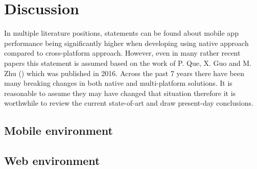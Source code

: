 
\chapter{Discussion}

In multiple literature positions, statements can be found about mobile app performance being significantly higher when developing using native approach compared to cross-platform approach. However, even in many rather recent papers this statement is assumed based on the work of P. Que, X. Guo and M. Zhu (\cite{que_comp_hybrid_native}) which was published in 2016. Across the past 7 years there have been many breaking changes in both native and multi-platform solutions. It is reasonable to assume they may have changed that situation therefore it is worthwhile to review the current state-of-art and draw present-day conclusions.

\section{Mobile environment}

\section{Web environment}